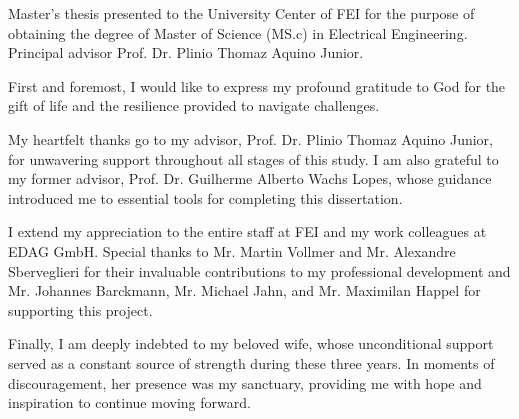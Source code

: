 \begin{folhaderosto}
Master's thesis presented to the University Center of FEI for the purpose of obtaining the degree of Master of Science (MS.c) in Electrical Engineering. Principal advisor Prof. Dr. Plinio Thomaz Aquino Junior.
\end{folhaderosto}

\fichacatalografica
\folhadeaprovacao

%


\begin{agradecimentos}
First and foremost, I would like to express my profound gratitude to God for the gift of life and the resilience provided to navigate challenges.

My heartfelt thanks go to my advisor, Prof. Dr. Plinio Thomaz Aquino Junior, for unwavering support throughout all stages of this study. I am also grateful to my former advisor, Prof. Dr. Guilherme Alberto Wachs Lopes, whose guidance introduced me to essential tools for completing this dissertation.

I extend my appreciation to the entire staff at FEI and my work colleagues at EDAG GmbH. Special thanks to Mr. Martin Vollmer and Mr. Alexandre Sberveglieri for their invaluable contributions to my professional development and Mr. Johannes Barckmann, Mr. Michael Jahn, and Mr. Maximilan Happel for supporting this project.

Finally, I am deeply indebted to my beloved wife, whose unconditional support served as a constant source of strength during these three years. In moments of discouragement, her presence was my sanctuary, providing me with hope and inspiration to continue moving forward.
\end{agradecimentos}

\begin{epigrafe}
\end{epigrafe}